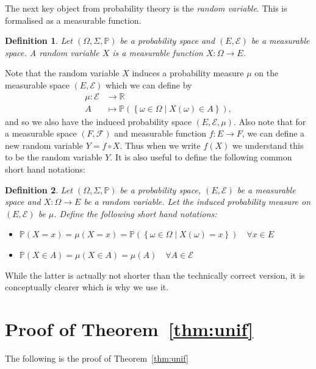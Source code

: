 \documentclass{article}
\newcommand{\set}[2]{\left\{ #1 \middle| #2 \right\}}
\newtheorem{definition}{Definition}
\theoremstyle{remark}
\renewcommand{\P}{\mathbb{P}}
\begin{document}
The next key object from probability theory is the \textit{random variable}.
This is formalised as a measurable function.

\begin{definition}
	Let $(\Omega, \Sigma, \P)$ be a probability space and $(E, \mathcal{E})$ be
	a measurable space. A random variable $X$ is a measurable function $X:
	\Omega \to E$.
\end{definition}

Note that the random variable $X$ induces a probability measure $\mu$ on the
measurable space $(E, \mathcal{E})$ which we can define by
\begin{align*}
	\mu: \mathcal{E} &\to \mathbb{R}\\
	A &\mapsto \P(\set{\omega \in \Omega}{X(\omega) \in A}),
\end{align*}
and so we also have the induced probability space $(E, \mathcal{E}, \mu)$. Also
note that for a measurable space $(F, \mathcal{F})$ and measurable function $f:
E \to F$, we can define a new random variable $Y = f \circ X$. Thus when we
write $f(X)$ we understand this to be the random variable $Y$. It is also
useful to define the following common short hand notations:

\begin{definition}
	Let $(\Omega, \Sigma, \P)$ be a probability space, $(E, \mathcal{E})$ be a
	measurable space and $X: \Omega \to E$ be a random variable. Let the
	induced probability measure on $(E, \mathcal{E})$ be $\mu$. Define the
	following short hand notations:
	\begin{itemize}
		\item $\P(X = x) = \mu(X = x) = \P(\set{\omega \in
			\Omega}{X(\omega) = x}) \quad \forall x \in E$
		\item $\P(X \in A) = \mu(X \in A) = \mu(A) \quad \forall A \in
			\mathcal{E}$
	\end{itemize}
\end{definition}

While the latter is actually not shorter than the technically correct version,
it is conceptually clearer which is why we use it.

\section{Proof of Theorem~\ref{thm:unif}}\label{app:unif}

The following is the proof of Theorem~\ref{thm:unif}
\end{document}
